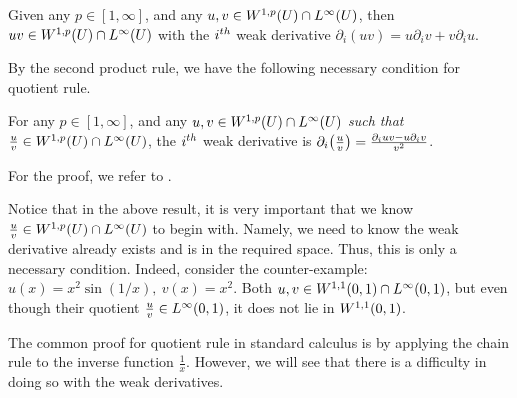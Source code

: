 \documentclass{ifacconf}
\begin{document}
\begin{prop}
\cite[Proposition 9.4]{brezis_functional_2011}
    Given any $p \in [1,\infty]$, and any $u, v \in {W^{1,p}_{}{\left ( U \right )}} \cap {L^{\infty}_{}{\left ( U \right )}}$, then $uv \in {W^{1,p}_{}{\left ( U \right )}} \cap {L^{\infty}_{}{\left ( U \right )}}$ with the $i^{th}$ weak derivative $\partial_i(uv) = u\partial_iv + v\partial_iu$. 
\end{prop}


By the second product rule, we have the following necessary condition for quotient rule.
\begin{cor}
\label{Quotient Rule - Necessary}
    For any $p \in [1,\infty]$, and any $u, v \in {W^{1,p}_{}{\left ( U \right )}} \cap {L^{\infty}_{}{\left ( U \right )}}$ \textit{such that} $\frac{u}{v} \in {W^{1,p}_{}{\left ( U \right )}} \cap {L^{\infty}_{}{\left ( U \right )}}$, the $i^{th}$ weak derivative is $\partial_i{\left ( \frac{u}{v} \right )} = \frac{\partial_iuv - u\partial_iv}{v^2}$.
\end{cor}

For the proof, we refer to \cite[Corollary~2.5.5]{yixing_multiplicative_2025}.

\begin{rem}
    Notice that in the above result, it is very important that we know $\frac{u}{v} \in {W^{1,p}_{}{\left ( U \right )}} \cap {L^{\infty}_{}{\left ( U \right )}}$ to begin with. Namely, we need to know the weak derivative already exists and is in the required space. Thus, this is only a necessary condition. Indeed, consider the counter-example: $u(x)=x^2\sin(1/x),~ v(x)=x^2.$ Both $u,v \in {W^{1,1}_{}{\left ( 0,1 \right )}} \cap {L^{\infty}_{}{\left ( 0,1 \right )}}$, but even though their quotient $\frac{u}{v} \in {L^{\infty}_{}{\left ( 0,1 \right )}}$, it does not lie in ${W^{1,1}_{}{\left ( 0,1 \right )}}$.
\end{rem}

The common proof for quotient rule in standard calculus is by applying the chain rule to the inverse function $\frac{1}{x}$. However, we will see that there is a difficulty in doing so with the weak derivatives.
\end{document}
